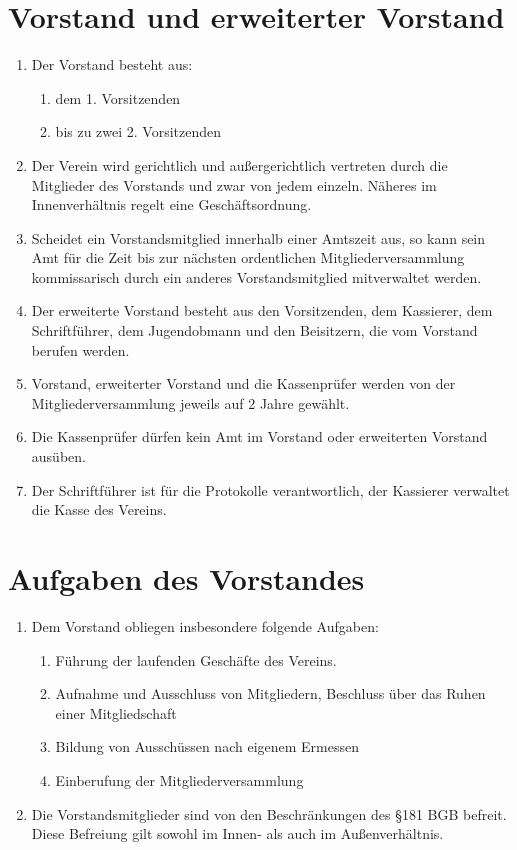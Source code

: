 \documentclass[10pt, twocolumn, parskip=half]{scrartcl}
\begin{document}
\section{Vorstand und erweiterter Vorstand}
\begin{enumerate}[noitemsep]
	\item Der Vorstand besteht aus:
	\begin{enumerate}[noitemsep]
		\item dem 1. Vorsitzenden
		\item bis zu zwei 2. Vorsitzenden
	\end{enumerate}
	\item Der Verein wird gerichtlich und außergerichtlich vertreten durch die Mitglieder des Vorstands und zwar von jedem einzeln. Näheres im Innenverhältnis regelt eine Geschäftsordnung.
	\item Scheidet ein Vorstandsmitglied innerhalb einer Amtszeit aus, so kann sein Amt für die Zeit bis zur nächsten ordentlichen Mitgliederversammlung kommissarisch durch ein anderes Vorstandsmitglied mitverwaltet werden.
	\item Der erweiterte Vorstand besteht aus den Vorsitzenden, dem Kassierer, dem Schriftführer, dem Jugendobmann und den Beisitzern, die vom Vorstand berufen werden.
	\item Vorstand, erweiterter Vorstand und die Kassenprüfer werden von der Mitgliederversammlung jeweils auf 2 Jahre gewählt.
	\item Die Kassenprüfer dürfen kein Amt im Vorstand oder erweiterten Vorstand ausüben.
	\item Der Schriftführer ist für die Protokolle verantwortlich, der Kassierer verwaltet die Kasse des Vereins.
\end{enumerate}

\section{Aufgaben des Vorstandes}
\begin{enumerate}[noitemsep]
	\item Dem Vorstand obliegen insbesondere folgende Aufgaben:
	\begin{enumerate}[noitemsep]
		\item  Führung der laufenden Geschäfte des Vereins.
		\item Aufnahme und Ausschluss von Mitgliedern, Beschluss über das Ruhen einer Mitgliedschaft
		\item Bildung von Ausschüssen nach eigenem Ermessen
		\item Einberufung der Mitgliederversammlung
	\end{enumerate}
	\item Die Vorstandsmitglieder sind von den Beschränkungen des §181 BGB befreit. Diese Befreiung gilt sowohl im Innen- als auch im Außenverhältnis.
\end{enumerate}
\end{document}
